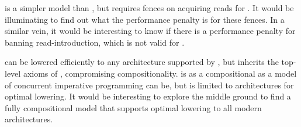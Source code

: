   
 is a simpler model than , but requires fences on
acquiring reads for \armeight{}.  It would be illuminating to find out what
the performance penalty is for these fences.  In a similar vein, it would be
interesting to know if there is a performance penalty for banning
read-introduction, which is not valid for \PwT{}.

\PwTc{} can be lowered efficiently to any architecture supported by \cXI{},
but inherits the top-level axioms of \rcXI{}, compromising compositionality.
\PwTmca{} is as a compositional as a model of concurrent imperative
programming can be, but is limited to \mca{} architectures for optimal
lowering.  It would be interesting to explore the middle ground to find a
fully compositional model that supports optimal lowering to all modern
architectures.









